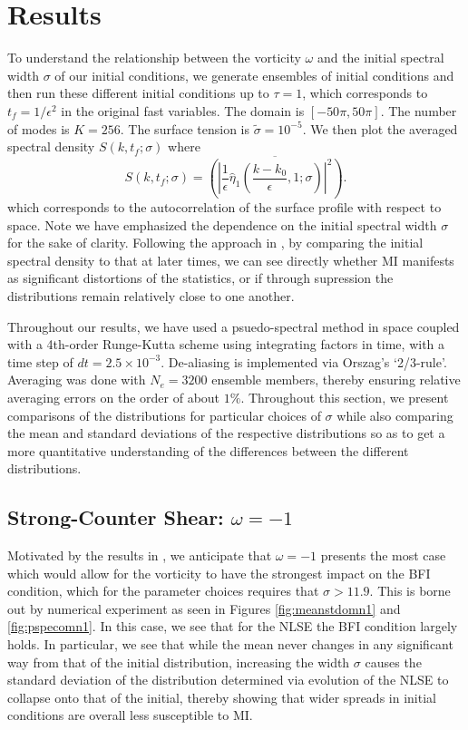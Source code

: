 \documentclass[a4paper,11pt]{article}
\begin{document}
\section*{Results}
To understand the relationship between the vorticity $\omega$ and the initial spectral width $\sigma$ of our initial conditions, we generate ensembles of initial conditions and then run these different initial conditions up to $\tau=1$, which corresponds to $t_{f} = 1/\epsilon^{2}$ in the original fast variables.  The domain is $[-50\pi,50\pi]$.  The number of modes is $K = 256$.  The surface tension is $\tilde{\sigma} = 10^{-5}$. We then plot the averaged spectral density $S(k,t_{f};\sigma)$ where 
\[
S\left(k,t_{f};\sigma\right) = \overline{\left( \left|\frac{1}{\epsilon}\hat{\eta}_{1}\left(\frac{k-k_{0}}{\epsilon},1;\sigma \right)\right|^{2}\right)}.
\]
which corresponds to the autocorrelation of the surface profile with respect to space.  Note we have emphasized the dependence on the initial spectral width $\sigma$ for the sake of clarity.  Following the approach in \cite{dysthe2,dysthe3}, by comparing the initial spectral density to that at later times, we can see directly whether MI manifests as significant distortions of the statistics, or if through supression the distributions remain relatively close to one another.  

Throughout our results, we have used a psuedo-spectral method in space coupled with a 4th-order Runge-Kutta scheme using integrating factors in time, with a time step of $dt = 2.5 \times 10^{-3}$.  De-aliasing is implemented via Orszag's `2/3-rule'.  Averaging was done with $N_{e}=3200$ ensemble members, thereby ensuring relative averaging errors on the order of about $1\%$.  Throughout this section, we present comparisons of the distributions for particular choices of $\sigma$ while also comparing the mean and standard deviations of the respective distributions so as to get a more quantitative understanding of the differences between the different distributions.  

\subsection*{Strong-Counter Shear: $\omega = -1$}

Motivated by the results in \cite{curtis8}, we anticipate that $\omega=-1$ presents the most case which would allow for the vorticity to have the strongest impact on the BFI condition, which for the parameter choices requires that $\sigma > 11.9$.  This is borne out by numerical experiment as seen in Figures \ref{fig:meanstdomn1} and \ref{fig:pspecomn1}.  In this case, we see that for the NLSE the BFI condition largely holds.  In particular, we see that while the mean never changes in any significant way from that of the initial distribution, increasing the width $\sigma$ causes the standard deviation of the distribution determined via evolution of the NLSE to collapse onto that of the initial, thereby showing that wider spreads in initial conditions are overall less susceptible to MI.   
\end{document}
